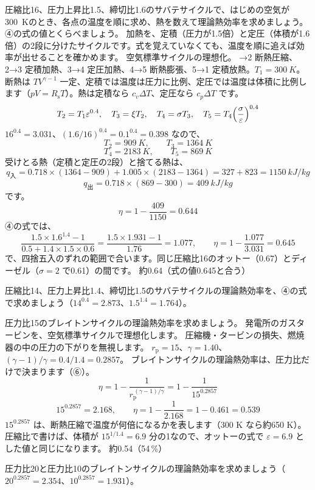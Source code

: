 \label{ph:熱-7:ex4}
\begin{phreidai}[サバテサイクルを温度で追う]
圧縮比16、圧力上昇比1.5、締切比1.6のサバテサイクルで、はじめの空気が\qty{300}{K}のとき、各点の温度を順に求め、熱を数えて理論熱効率を求めましょう。④の式の値とくらべましょう。
\phbamen
加熱を、定積（圧力が1.5倍）と定圧（体積が1.6倍）の2段に分けたサイクルです。式を覚えていなくても、温度を順に追えば効率が出せることを確かめます。
\phmushi
空気標準サイクルの理想化。
→2 断熱圧縮、2→3 定積加熱、3→4 定圧加熱、4→5 断熱膨張、5→1 定積放熱。$T_1=\qty{300}{K}$。
\phriyu
断熱は $TV^{\gamma-1}$ 一定、定積では温度は圧力に比例、定圧では温度は体積に比例します（$pV=R_{\mathrm s}T$）。熱は定積なら $c_v\Delta T$、定圧なら $c_p\Delta T$ です。
\phtateru
\[T_2=T_1\varepsilon^{0.4},\quad T_3=\xi T_2,\quad T_4=\sigma T_3,\quad T_5=T_4\Bigl(\frac{\sigma}{\varepsilon}\Bigr)^{0.4}\]
\phtoku
$16^{0.4}=3.031$、$(1.6/16)^{0.4}=0.1^{0.4}=0.398$ なので、
\[T_2=\qty{909}{K},\qquad T_3=\qty{1364}{K}\]
\[T_4=\qty{2183}{K},\qquad T_5=\qty{869}{K}\]
受けとる熱（定積と定圧の2段）と捨てる熱は、
\[q_{\text{入}}=0.718\times(1364-909)+1.005\times(2183-1364)=327+823=\qty{1150}{kJ/kg}\]
\[q_{\text{出}}=0.718\times(869-300)=\qty{409}{kJ/kg}\]
です。
\[\eta=1-\frac{409}{1150}=0.644\]
\phtashikame
④の式では、
\[\frac{1.5\times1.6^{1.4}-1}{0.5+1.4\times1.5\times0.6}=\frac{1.5\times1.931-1}{1.76}=1.077,\qquad\eta=1-\frac{1.077}{3.031}=0.645\]
で、四捨五入のずれの範囲で合います。同じ圧縮比16のオットー（0.67）とディーゼル（$\sigma=2$ で0.61）の間です。
\kotae 約0.64（式の値0.645と合う）
\end{phreidai}
\begin{jibun}
圧縮比14、圧力上昇比1.4、締切比1.5のサバテサイクルの理論熱効率を、④の式で求めましょう（$14^{0.4}=2.873$、$1.5^{1.4}=1.764$）。
\end{jibun}

\label{ph:熱-7:ex5}
\begin{phreidai}[ガスタービンの理論熱効率]
圧力比15のブレイトンサイクルの理論熱効率を求めましょう。
\phbamen
発電所のガスタービンを、空気標準サイクルで理想化します。
\phmushi
圧縮機・タービンの損失、燃焼器の中の圧力の下がりを無視します。
\phzu
$r_{\mathrm p}=15$、$\gamma=1.40$、$(\gamma-1)/\gamma=0.4/1.4=0.2857$。
\phriyu
ブレイトンサイクルの理論熱効率は、圧力比だけで決まります（⑥）。
\phtateru
\[\eta=1-\frac{1}{r_{\mathrm p}^{\,(\gamma-1)/\gamma}}=1-\frac{1}{15^{0.2857}}\]
\phtoku
\[15^{0.2857}=2.168,\qquad\eta=1-\frac{1}{2.168}=1-0.461=0.539\]
\phtashikame
$15^{0.2857}$ は、断熱圧縮で温度が何倍になるかを表します（300 K なら約650 K）。圧縮比で書けば、体積が $15^{1/1.4}=6.9$ 分の1なので、オットーの式で $\varepsilon=6.9$ とした値と同じになります。
\kotae 約0.54（54\,\%）
\end{phreidai}
\begin{jibun}
圧力比20と圧力比10のブレイトンサイクルの理論熱効率を求めましょう（$20^{0.2857}=2.354$、$10^{0.2857}=1.931$）。
\end{jibun}

